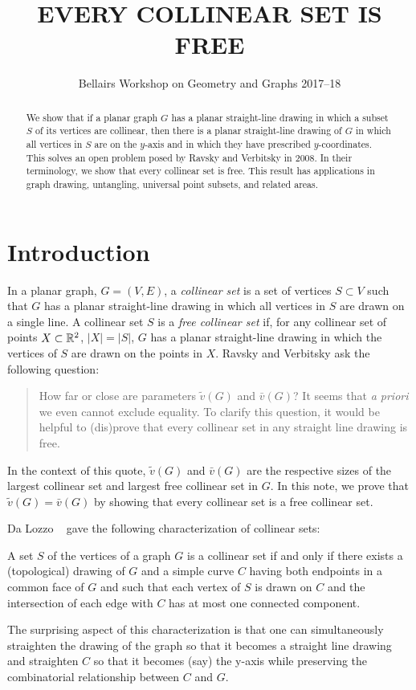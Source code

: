 \documentclass{patmorin}
\title{\MakeUppercase{Every Collinear Set is Free}}
\author{Bellairs Workshop on Geometry and Graphs 2017--18}
\begin{document}
\maketitle


\begin{abstract}
  We show that if a planar graph $G$ has a planar straight-line drawing
  in which a subset $S$ of its vertices are collinear, then there is a
  planar straight-line drawing of $G$ in which all vertices in $S$ are
  on the $y$-axis and in which they have prescribed $y$-coordinates.
  This solves an open problem posed by Ravsky and Verbitsky in 2008.
  In their terminology, we show that every collinear set is free.
  This result has applications in graph drawing, untangling, universal
  point subsets, and related areas.
\end{abstract}


\section{Introduction}

In a planar graph, $G=(V,E)$, a \emph{collinear set} is a set of vertices
$S\subset V$ such that $G$ has a planar straight-line drawing in which
all vertices in $S$ are drawn on a single line.  A collinear set $S$
is a \emph{free collinear set} if, for any collinear set of points
$X\subset\mathbb{R}^2$, $|X|=|S|$, $G$ has a planar straight-line drawing in
which the vertices of $S$ are drawn on the points in $X$.  Ravsky and
Verbitsky \cite{ravsky.verbitsky:on,ravsky.verbitsky:on-arxiv} ask the
following question:

\begin{quote}
   How far or close are parameters $\tilde{v}(G)$ and $\bar{v}(G)$? It
   seems that \emph{a priori} we even cannot exclude equality. To clarify
   this question, it would be helpful to (dis)prove that every collinear
   set in any straight line drawing is free.
\end{quote}

In the context of this quote, $\tilde{v}(G)$ and $\bar{v}(G)$ are the
respective sizes of the largest collinear set and largest free collinear
set in $G$.  In this note, we prove that $\tilde{v}(G)=\bar{v}(G)$ by
showing that every collinear set is a free collinear set.  

Da Lozzo \etal\ \cite{dalozzo.dujmovic.ea:drawing}
gave the following characterization of collinear sets:
\begin{thm}
   A set $S$ of the vertices of a graph $G$ is a collinear set if and
   only if there exists a (topological) drawing of $G$ and a simple curve
   $C$ having both endpoints in a common face of $G$ and such that each
   vertex of $S$ is drawn on $C$ and the intersection of each edge with
   $C$ has at most one connected component.
\end{thm}
The surprising aspect of this characterization is that one can
simultaneously straighten the drawing of the graph so that it becomes
a straight line drawing and straighten $C$ so that it becomes (say)
the y-axis while preserving the combinatorial relationship between $C$
and $G$.
\end{document}
